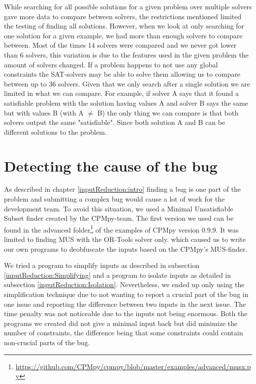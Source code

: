 While searching for all possible solutions for a given problem over multiple solvers gave more data to compare between solvers, the restrictions mentioned limited the testing of finding all solutions. However, when we look at only searching for one solution for a given example, we had more than enough solvers to compare between. Most of the times 14 solvers were compared and we never got lower than 6 solvers, this variation is due to the features used in the given problem the amount of solvers changed. If a problem happens to not use any global constraints the SAT-solvers may be able to solve them allowing us to compare between up to 36 solvers. Given that we only search after a single solution we are limited in what we can compare. For example, if solver A says that it found a satisfiable problem with the solution having values A and solver B says the same but with values B (with A $\neq$ B) the only thing we can compare is that both solvers output the same "satisfiable". Since both solution A and B can be different solutions to the problem.


\section{Detecting the cause of the bug}
\label{impl:DetectingCause}
As described in chapter \ref{inputReduction:intro} finding a bug is one part of the problem and submitting a complex bug would cause a lot of work for the development team. To avoid this situation, we used a Minimal Unsatisfiable Subset finder created by the CPMpy-team. The first version we used can be found in the advanced folder\footnote{\url{https://github.com/CPMpy/cpmpy/blob/master/examples/advanced/musx.py}} of the examples of CPMpy version 0.9.9. It was limited to finding MUS with the OR-Tools solver only. which caused us to write our own programs to deobfuscate the inputs based on the CPMpy's MUS-finder. 

We tried a program to simplify inputs as described in subsection \ref{inputReduction:Simplifying} and a program to isolate inputs as detailed in subsection \ref{inputReduction:Isolation}. Nevertheless, we ended up only using the simplification technique due to not wanting to report a crucial part of the bug in one issue and reporting the difference between two inputs in the next issue. The time penalty was not noticeable due to the inputs not being enormous. Both the programs we created did not give a minimal input back but did minimize the number of constraints, the difference being that some constraints could contain non-crucial parts of the bug. 

